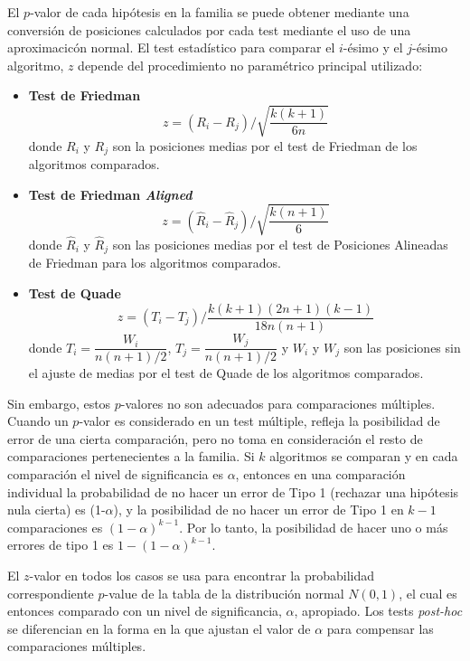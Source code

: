 El $p$-valor de cada hipótesis en la familia se puede obtener mediante una conversión de posiciones calculados por cada test mediante el uso de una aproximacicón normal. 
El test estadístico para comparar el $i$-ésimo y el $j$-ésimo algoritmo, $z$ depende del procedimiento no paramétrico principal utilizado:
\begin{itemize}
	\item \textbf{Test de Friedman}
	\begin{equation}
		z = (R_i-R_j)/\sqrt{\dfrac{k(k+1)}{6n}}
	\label{eq:4.44}
	\end{equation}
	donde $R_i$ y $R_j$ son la posiciones medias por el test de Friedman de los algoritmos comparados.
	\item \textbf{Test de Friedman \textit{Aligned}}
	\begin{equation}
		z = (\hat{R}_i - \hat{R}_j) / \sqrt{\dfrac{k(n+1)}{6}}
	\label{eq:4.45}
	\end{equation}
	donde $\hat{R}_i$ y $\hat{R}_j$ son las posiciones medias por el test de Posiciones Alineadas de Friedman	para los algoritmos comparados.
	\item \textbf{Test de Quade}
	\begin{equation}
		z = (T_i-T_j) / \dfrac{k(k+1)(2n+1)(k-1)}{18n(n+1)}
	\label{eq:4.46}
	\end{equation}
	donde $T_i = \dfrac{W_i}{n(n+1)/2}$, $T_j = \dfrac{W_j}{n(n+1)/2}$ y $W_i$ y $W_j$ son las posiciones sin el ajuste de medias por el test de Quade de los algoritmos comparados. 
\end{itemize}

Sin embargo, estos $p$-valores no son adecuados para comparaciones múltiples. 
Cuando un $p$-valor es considerado en un test múltiple, refleja la posibilidad de error de una cierta comparación, pero no toma en consideración el resto de comparaciones pertenecientes a la familia. 
Si $k$ algoritmos se comparan y en cada comparación el nivel de significancia es $\alpha$, entonces en una comparación individual la probabilidad de no hacer un error de Tipo 1 (rechazar una hipótesis nula cierta) es (1-$\alpha$), y la posibilidad de no hacer un error de Tipo 1 en $k-1$ comparaciones es $(1-\alpha)^{k-1}$. 
Por lo tanto, la posibilidad de hacer uno o más errores de tipo 1 es $1-(1-\alpha)^{k-1}$. 

El $z$-valor en todos los casos se usa para encontrar la probabilidad correspondiente $p$-value de la tabla de la distribución normal $N(0,1)$, el cual es entonces comparado con un nivel de significancia, $\alpha$, apropiado. 
Los tests \textit{post-hoc} se diferencian en la forma en la que ajustan el valor de $\alpha$ para compensar las comparaciones múltiples.

